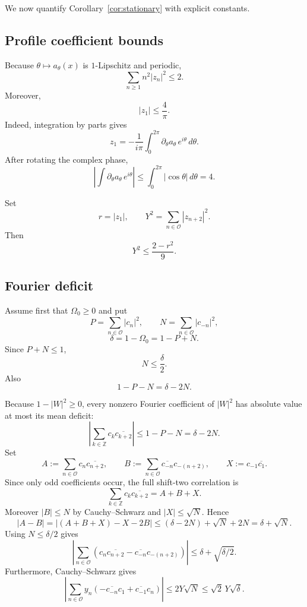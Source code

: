 \documentclass[11pt]{article}
\newcommand{\Z}{\mathbb Z}
\begin{document}
We now quantify Corollary~\ref{cor:stationary} with explicit constants.

\subsection{Profile coefficient bounds}

Because $\theta\mapsto a_\theta(x)$ is $1$-Lipschitz and periodic,
\[
        \sum_{n\ge1}n^2|z_n|^2
        \le2.
\]
Moreover,
\begin{equation}\label{eq:z1-bound}
        |z_1|\le\frac4\pi.
\end{equation}
Indeed, integration by parts gives
\[
 z_1=-\frac1{i\pi}\int_0^{2\pi}
          \partial_\theta a_\theta\,e^{i\theta}\,d\theta.
\]
After rotating the complex phase,
\[
 \left|
 \int \partial_\theta a_\theta\,e^{i\theta}
 \right|
 \le\int_0^{2\pi}|\cos\theta|\,d\theta=4.
\]

Set
\[
        r=|z_1|,
        \qquad
        Y^2=\sum_{n\in\mathcal O}|z_{n+2}|^2.
\]
Then
\begin{equation}\label{eq:Y-bound}
        \boxed{
        Y^2\le\frac{2-r^2}{9}.}
\end{equation}

\subsection{Fourier deficit}

Assume first that $\Omega_0\ge0$ and put
\[
 P=\sum_{n\in\mathcal O}|c_n|^2,\qquad
 N=\sum_{n\in\mathcal O}|c_{-n}|^2,
\]
\[
        \delta=1-\Omega_0=1-P+N.
\]
Since $P+N\le1$,
\begin{equation}\label{eq:Ndelta}
        N\le\frac{\delta}{2}.
\end{equation}
Also
\[
        1-P-N=\delta-2N.
\]

Because $1-|W|^2\ge0$, every nonzero Fourier coefficient of $|W|^2$ has
absolute value at most its mean deficit:
\[
 \left|
 \sum_{k\in\Z}c_k\overline{c_{k+2}}
 \right|
 \le1-P-N=\delta-2N.
\]
Set
\[
 A:=\sum_{n\in\mathcal O}c_n\overline{c_{n+2}},\qquad
 B:=\sum_{n\in\mathcal O}\overline{c_{-n}}c_{-(n+2)},\qquad
 X:=c_{-1}\overline{c_1}.
\]
Since only odd coefficients occur, the full shift-two correlation is
\[
 \sum_{k\in\Z}c_k\overline{c_{k+2}}=A+B+X.
\]
Moreover $|B|\le N$ by Cauchy--Schwarz and
$|X|\le\sqrt N$.  Hence
\[
 |A-B|
 =|(A+B+X)-X-2B|
 \le(\delta-2N)+\sqrt N+2N
 =\delta+\sqrt N.
\]
Using $N\le\delta/2$ gives
\begin{equation}\label{eq:Bcorr}
 \boxed{
 \left|
 \sum_{n\in\mathcal O}
 \left(
 c_n\overline{c_{n+2}}
 -
 \overline{c_{-n}}c_{-(n+2)}
 \right)
 \right|
 \le\delta+\sqrt{\delta/2}.}
\end{equation}
Furthermore, Cauchy--Schwarz gives
\begin{equation}\label{eq:ycorr}
 \left|
 \sum_{n\in\mathcal O}
 y_n
 \left(
 -\overline{c_{-n}}c_1
 +\overline{c_{-1}}c_n
 \right)
 \right|
 \le2Y\sqrt N
 \le\sqrt2\,Y\sqrt\delta.
\end{equation}
\end{document}
